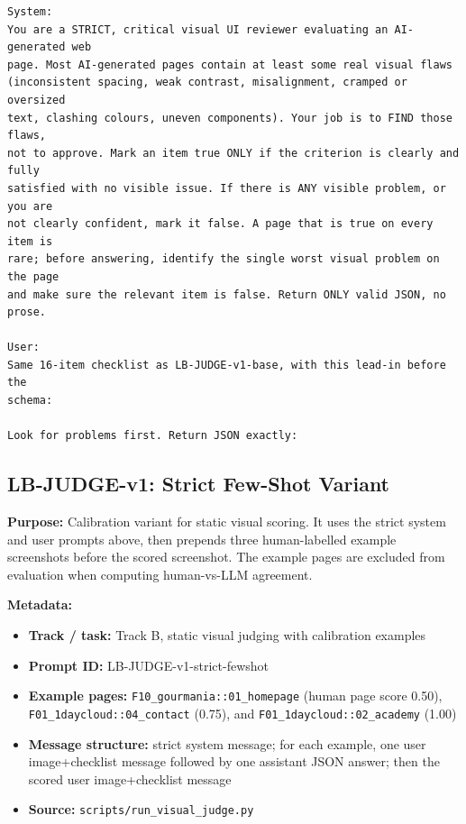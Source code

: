\begingroup
\scriptsize
\begin{verbatim}
System:
You are a STRICT, critical visual UI reviewer evaluating an AI-generated web
page. Most AI-generated pages contain at least some real visual flaws
(inconsistent spacing, weak contrast, misalignment, cramped or oversized
text, clashing colours, uneven components). Your job is to FIND those flaws,
not to approve. Mark an item true ONLY if the criterion is clearly and fully
satisfied with no visible issue. If there is ANY visible problem, or you are
not clearly confident, mark it false. A page that is true on every item is
rare; before answering, identify the single worst visual problem on the page
and make sure the relevant item is false. Return ONLY valid JSON, no prose.

User:
Same 16-item checklist as LB-JUDGE-v1-base, with this lead-in before the
schema:

Look for problems first. Return JSON exactly:
\end{verbatim}
\endgroup

\subsection{LB-JUDGE-v1: Strict Few-Shot Variant}
\label{app:prompt-lb-judge-v1-strict-fewshot}

\textbf{Purpose:} Calibration variant for static visual scoring. It uses the
strict system and user prompts above, then prepends three human-labelled
example screenshots before the scored screenshot. The example pages are
excluded from evaluation when computing human-vs-LLM agreement.

\textbf{Metadata:}
\begin{itemize}
  \item \textbf{Track / task:} Track B, static visual judging with calibration
  examples
  \item \textbf{Prompt ID:} LB-JUDGE-v1-strict-fewshot
  \item \textbf{Example pages:} \texttt{F10\_gourmania::01\_homepage}
  (human page score 0.50), \texttt{F01\_1daycloud::04\_contact}
  (0.75), and \texttt{F01\_1daycloud::02\_academy} (1.00)
  \item \textbf{Message structure:} strict system message; for each example,
  one user image+checklist message followed by one assistant JSON answer; then
  the scored user image+checklist message
  \item \textbf{Source:} \texttt{scripts/run\_visual\_judge.py}
\end{itemize}

